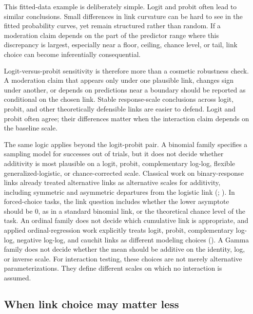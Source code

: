 \documentclass[
  man,
  longtable,
  nolmodern,
  notxfonts,
  notimes,
  colorlinks=true,linkcolor=blue,citecolor=blue,urlcolor=blue]{apa7}
\begin{document}
This fitted-data example is deliberately simple. Logit and probit often
lead to similar conclusions. Small differences in link curvature can be
hard to see in the fitted probability curves, yet remain structured
rather than random. If a moderation claim depends on the part of the
predictor range where this discrepancy is largest, especially near a
floor, ceiling, chance level, or tail, link choice can become
inferentially consequential.

Logit-versus-probit sensitivity is therefore more than a cosmetic
robustness check. A moderation claim that appears only under one
plausible link, changes sign under another, or depends on predictions
near a boundary should be reported as conditional on the chosen link.
Stable response-scale conclusions across logit, probit, and other
theoretically defensible links are easier to defend. Logit and probit
often agree; their differences matter when the interaction claim depends
on the baseline scale.

The same logic applies beyond the logit-probit pair. A binomial family
specifies a sampling model for successes out of trials, but it does not
decide whether additivity is most plausible on a logit, probit,
complementary log-log, flexible generalized-logistic, or
chance-corrected scale. Classical work on binary-response links already
treated alternative links as alternative scales for additivity,
including symmetric and asymmetric departures from the logistic link
(;
). In forced-choice tasks, the
link question includes whether the lower asymptote should be 0, as in a
standard binomial link, or the theoretical chance level of the task. An
ordinal family does not decide which cumulative link is appropriate, and
applied ordinal-regression work explicitly treats logit, probit,
complementary log-log, negative log-log, and cauchit links as different
modeling choices (). A Gamma
family does not decide whether the mean should be additive on the
identity, log, or inverse scale. For interaction testing, these choices
are not merely alternative parameterizations. They define different
scales on which no interaction is assumed.

\subsection{When link choice may matter
less}\label{when-link-choice-may-matter-less}
\end{document}
